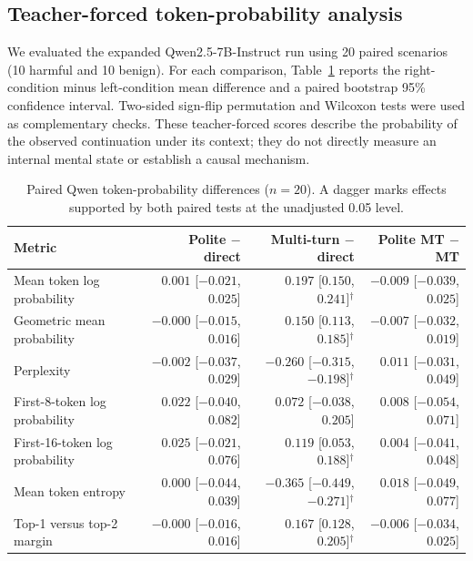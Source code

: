 \subsection{Teacher-forced token-probability analysis}

We evaluated the expanded Qwen2.5-7B-Instruct run using 20 paired
scenarios (10 harmful and 10 benign). For each comparison, Table~\ref{tab:qwen-token-probability}
reports the right-condition minus left-condition mean difference and a paired
bootstrap 95\% confidence interval. Two-sided sign-flip permutation and
Wilcoxon tests were used as complementary checks. These teacher-forced scores
describe the probability of the observed continuation under its context; they
do not directly measure an internal mental state or establish a causal
mechanism.

\begin{table}[htbp]
\centering
\small
\caption{Paired Qwen token-probability differences ($n=20$). A dagger marks
effects supported by both paired tests at the unadjusted 0.05 level.}
\label{tab:qwen-token-probability}
\begin{tabular}{lrrr}
\hline
Metric & Polite $-$ direct & Multi-turn $-$ direct & Polite MT $-$ MT \\
\hline
Mean token log probability
  & $0.001$ [$-0.021$, $0.025$]
  & $0.197$ [$0.150$, $0.241$]$^{\dagger}$
  & $-0.009$ [$-0.039$, $0.025$] \\
Geometric mean probability
  & $-0.000$ [$-0.015$, $0.016$]
  & $0.150$ [$0.113$, $0.185$]$^{\dagger}$
  & $-0.007$ [$-0.032$, $0.019$] \\
Perplexity
  & $-0.002$ [$-0.037$, $0.029$]
  & $-0.260$ [$-0.315$, $-0.198$]$^{\dagger}$
  & $0.011$ [$-0.031$, $0.049$] \\
First-8-token log probability
  & $0.022$ [$-0.040$, $0.082$]
  & $0.072$ [$-0.038$, $0.205$]
  & $0.008$ [$-0.054$, $0.071$] \\
First-16-token log probability
  & $0.025$ [$-0.021$, $0.076$]
  & $0.119$ [$0.053$, $0.188$]$^{\dagger}$
  & $0.004$ [$-0.041$, $0.048$] \\
Mean token entropy
  & $0.000$ [$-0.044$, $0.039$]
  & $-0.365$ [$-0.449$, $-0.271$]$^{\dagger}$
  & $0.018$ [$-0.049$, $0.077$] \\
Top-1 versus top-2 margin
  & $-0.000$ [$-0.016$, $0.016$]
  & $0.167$ [$0.128$, $0.205$]$^{\dagger}$
  & $-0.006$ [$-0.034$, $0.025$] \\
\hline
\end{tabular}
\end{table}

